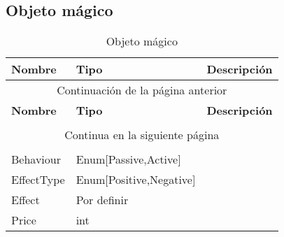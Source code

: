 \subsection{Objeto mágico}

\begin{longtable}[H]{
    @{}
    l
    l
    l
    @{}
    }%

    \toprule        %
    \textbf{Nombre} & \textbf{Tipo} & \textbf{Descripción} \\      %
    \midrule        %
    \endfirsthead   %

    \multicolumn{3}{c}{Continuación de la página anterior}\\
    \toprule
    \textbf{Nombre} & \textbf{Tipo} & \textbf{Descripción} \\\\      %
    \midrule        %
    \endhead        %

    \midrule
    \multicolumn{3}{c}{Continua en la siguiente página}\\ %
    \endfoot        %

    \bottomrule
    \caption{Objeto mágico \label{tab:entidad_magic_object}} \\
    \endlastfoot    %

    Behaviour  & Enum[Passive,Active]    & \\
    EffectType & Enum[Positive,Negative] & \\
    Effect     & Por definir             & \\
    Price      & int                     & \\
\end{longtable}